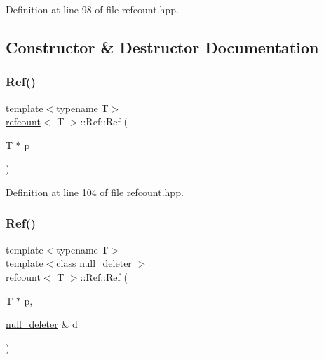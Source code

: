 Definition at line 98 of file refcount.\+hpp.



\subsection{Constructor \& Destructor Documentation}
\mbox{\label{structrefcount_1_1Ref_a2c39ccf3dc44ae026d1c8060381831b6}} 
\subsubsection{\texorpdfstring{Ref()}{Ref()}\hspace{0.1cm}{\footnotesize\ttfamily [1/2]}}
{\footnotesize\ttfamily template$<$typename T$>$ \\
\hyperlink{structrefcount}{refcount}$<$ T $>$\+::Ref\+::\+Ref (\begin{DoxyParamCaption}\item[{T $\ast$}]{p }\end{DoxyParamCaption})\hspace{0.3cm}{\ttfamily [inline]}}



Definition at line 104 of file refcount.\+hpp.

\mbox{\label{structrefcount_1_1Ref_a68eead7694eb1503d6da6ff95e668d90}} 
\subsubsection{\texorpdfstring{Ref()}{Ref()}\hspace{0.1cm}{\footnotesize\ttfamily [2/2]}}
{\footnotesize\ttfamily template$<$typename T$>$ \\
template$<$class null\+\_\+deleter $>$ \\
\hyperlink{structrefcount}{refcount}$<$ T $>$\+::Ref\+::\+Ref (\begin{DoxyParamCaption}\item[{T $\ast$}]{p,  }\item[{\hyperlink{structnull__deleter}{null\+\_\+deleter} \&}]{d }\end{DoxyParamCaption})\hspace{0.3cm}{\ttfamily [inline]}}



